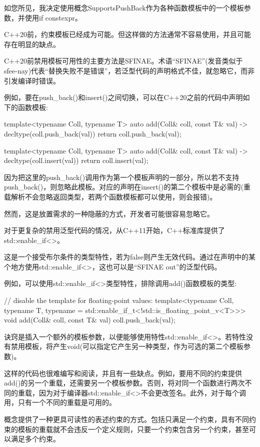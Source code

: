如您所见，我决定使用概念SupportsPushBack作为各种函数模板中的一个模板参数，并使用if constexpr。


C++20前，约束模板已经成为可能。但这样做的方法通常不容易使用，并且可能存在明显的缺点。


C++20前禁用模板可用性的主要方法是SFINAE。术语“SFINAE”(发音类似于sfee-nay)代表“替换失败不是错误”，若泛型代码的声明格式不佳，就忽略它，而非引发编译时错误。

例如，要在push\_back()和insert()之间切换，可以在C++20之前的代码中声明如下的函数模板:

\begin{cpp}
template<typename Coll, typename T>
auto add(Coll& coll, const T& val) -> decltype(coll.push_back(val))
{
	return coll.push_back(val);
}

template<typename Coll, typename T>
auto add(Coll& coll, const T& val) -> decltype(coll.insert(val))
{
	return coll.insert(val);
}
\end{cpp}

因为把这里的push\_back()调用作为第一个模板声明的一部分，所以若不支持push\_back()，则忽略此模板。对应的声明在insert()的第二个模板中是必需的(重载解析不会忽略返回类型，若两个函数模板都可以使用，则会报错)。

然而，这是放置需求的一种隐蔽的方式，开发者可能很容易忽略它。


对于更复杂的禁用泛型代码的情况，从C++11开始，C++标准库提供了std::enable\_if<>。

这是一个接受布尔条件的类型特性，若为false则产生无效代码。通过在声明中的某个地方使用std::enable\_if<>，这也可以是“SFINAE out”的泛型代码。

例如，可以使用std::enable\_if<>类型特性，排除调用add()函数模板的类型:

\begin{cpp}
// disable the template for floating-point values:
template<typename Coll, typename T,
typename = std::enable_if_t<!std::is_floating_point_v<T>>>
void add(Coll& coll, const T& val)
{
	coll.push_back(val);
}
\end{cpp}

诀窍是插入一个额外的模板参数，以便能够使用特性std::enable\_if<>。若特性没有禁用模板，将产生void(可以指定它产生另一种类型，作为可选的第二个模板参数)。

这样的代码也很难编写和阅读，并且有一些缺点。例如，要用不同的约束提供add()的另一个重载，还需要另一个模板参数。否则，将对同一个函数进行两次不同的重载，因为对于编译器std::enable\_if<>不会更改签名。此外，对于每个调用，只有一个不同的重载是可用的。

概念提供了一种更具可读性的表述约束的方式。包括只满足一个约束，具有不同约束的模板的重载就不会违反一个定义规则，只要一个约束包含另一个约束，甚至可以满足多个约束。




